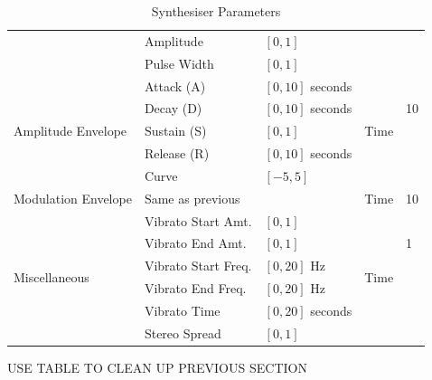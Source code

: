 \documentclass[11pt, oneside]{report}   	%
\begin{document}
\begin{table}[]
\begin{tabular}{|l|l|l|l|l|}
																	  & Amplitude               	& $[0, 1]$                   		&                       			&\\
																	  & Pulse Width                & $[0, 1]$                   		&                       			&\\ \hline
		\multirow{5}{*}{Amplitude Envelope}    & Attack (A)       				& $[0, 10]$ seconds        & \multirow{5}{*}{Time}& \multirow{3}{*}{10} \\
																	  & Decay (D)               		& $[0, 10]$ seconds         &                       			&\\
																	  & Sustain (S)             	 	 & $[0, 1]$                   		&                       			&\\
																	  & Release (R)             		& $[0, 10]$ seconds        &                       			&\\
																	  & Curve                   	   	   & $[-5, 5]$                  	&                       			&\\ \hline
		Modulation Envelope        						& Same as previous           &                            			& Time              	& 10									\\ \hline
		\multirow{6}{*}{Miscellaneous}             & Vibrato Start Amt.    		  & $[0, 1]$                   	& \multirow{6}{*}{Time}& \multirow{3}{*}{1} \\
																	  & Vibrato End Amt.	         & $[0, 1]$                   		&                       			&\\
																	  & Vibrato Start Freq.			  & $[0, 20]$ Hz               &                       			&\\
																	  & Vibrato End Freq.		      & $[0, 20]$ Hz               &                       			&\\
																	  & Vibrato Time            		& $[0, 20]$ seconds      &                       			&\\
																	  & Stereo Spread           	  & $[0, 1]$                   		&                       			&\\ \hline
	\end{tabular}
\caption{Synthesiser Parameters}
\label{tab:Params}
\end{table}

USE TABLE TO CLEAN UP PREVIOUS SECTION
\end{document}
